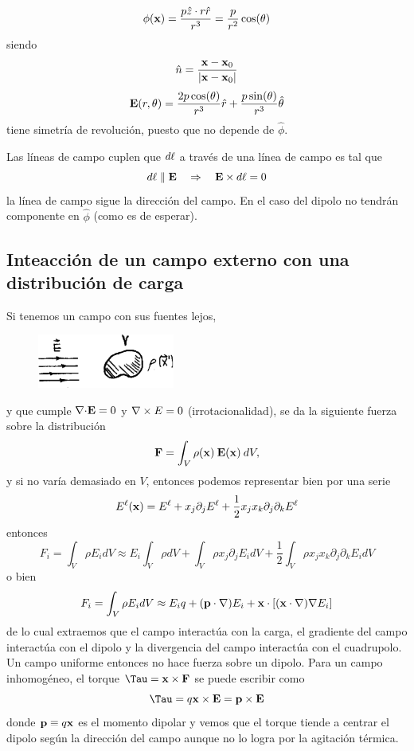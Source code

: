 \documentclass[10pt,oneside]{CBFT_book}
\begin{document}
\[
	\phi(\vb{x}) = \frac{p\hat{z}\cdot r\hat{r}}{r^3} = \frac{p}{r^2} \cos(\theta)
\]
siendo 
\[
	\hat{n} = \frac{\vb{x}-\vb{x}_0}{|\vb{x}-\vb{x}_0|}
\]
\[
	\vb{E}(r,\theta) = \frac{2 p\cos(\theta)}{r^3} \hat{r} + \frac{p\sin(\theta)}{r^3} \hat{\theta}
\]
tiene simetría de revolución, puesto que no depende de $\hat{\phi}$.

Las líneas de campo cuplen que $d\vb{\ell}$ a través de una línea de campo es tal que 
\[
	d\vb{\ell} \parallel \vb{E} \quad \Rightarrow \quad  \vb{E} \times d\vb{\ell}  = 0
\]
la línea de campo sigue la dirección del campo. En el caso del dipolo no tendrán componente en
$\hat{\phi}$ (como es de esperar).

\subsection{Inteacción de un campo externo con una distribución de carga}

Si tenemos un campo  con sus fuentes lejos,

\begin{figure}[htb]
	\begin{center}
	\includegraphics[width=0.4\textwidth]{images/fig_ft1_dipolar3.pdf}	 
	\end{center}
	\caption{}
\end{figure}

y que cumple $\mathbf{\nabla}\mathbf{\cdot}\mathbf{E}=0$ y $\mathbf{\nabla}\times{E}=0$ (irrotacionalidad), se da la siguiente fuerza sobre la distribución
\[
	\vb{F} = \int_V \rho(\vb{x}) \: \vb{E}(\vb{x}) \: dV,
\]
y si  no varía demasiado en $V$, entonces podemos representar bien por una serie
\[
	E^\ell(\vb{x}) = E^\ell + x_j \partial_j E^\ell + \frac{1}{2} x_j x_k \partial_j\partial_k E^\ell
\]
entonces 
\[
	F_i = \int_V \rho E_i dV \approx E_i \int_V \rho dV + \int_V \rho  x_j \partial_j E_i dV +
		\frac{1}{2} \int_V \rho x_j x_k \partial_j\partial_k E_i dV 
\]
o bien 
\[
	F_i = \int_V \rho E_i dV \approx E_i q + (\vb{p}\cdot\Nabla) E_i  +
		\vb{x}\cdot\left[ (\vb{x}\cdot\Nabla)\Nabla E_i\right]
\]
de lo cual extraemos que el campo interactúa con la carga, el gradiente del campo interactúa con el dipolo
y la divergencia del campo interactúa con el cuadrupolo.
Un campo uniforme entonces no hace fuerza sobre un dipolo.
Para un campo inhomogéneo, el torque $\vb{\Tau} = \vb{x} \times \vb{F}$ se puede escribir como 
\[
	\vb{\Tau} = q\vb{x} \times \vb{E} = \vb{p} \times \vb{E}
\]
donde $\vb{p}\equiv q\vb{x}$ es el momento dipolar y vemos que el torque tiende a centrar el dipolo
según la dirección del campo  aunque no lo logra por la agitación térmica.
\end{document}
